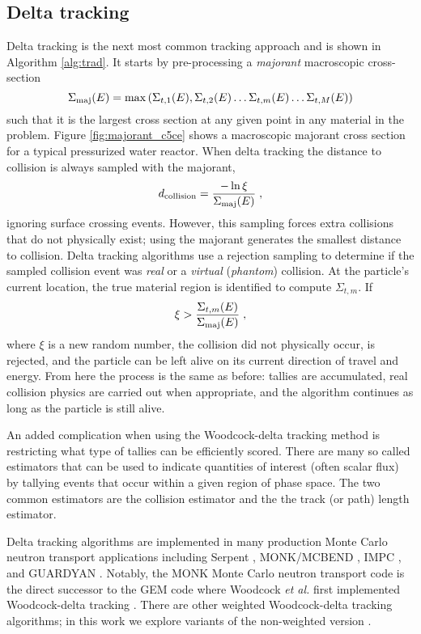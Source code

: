 \subsection{Delta tracking}
\label{c5:delta_tracking}

Delta tracking is the next most common tracking approach and is shown in Algorithm \ref{alg:trad}.
It starts by pre-processing a \textit{majorant} macroscopic cross-section
\begin{equation}
    \Sigma_{\text{maj}}(E) = \max\left({\Sigma_{t,1}(E), \Sigma_{t,2}(E) \dots \Sigma_{t,m}(E) \dots \Sigma_{t,M}(E)}\right)
\end{equation}
such that it is the largest cross section at any given point in any material in the problem.
Figure \ref{fig:majorant_c5ce} shows a macroscopic majorant cross section for a typical pressurized water reactor.
When delta tracking the distance to collision is always sampled with the majorant,
\begin{equation}
    d_{\text{collision}} = \frac{-\ln{\xi}}{\Sigma_{\text{maj}}(E)} \; ,
\end{equation}
ignoring surface crossing events.
However, this sampling forces extra collisions that do not physically exist; using the majorant generates the smallest distance to collision.
Delta tracking algorithms use a rejection sampling to determine if the sampled collision event was \textit{real} or a \textit{virtual} (\textit{phantom}) collision.
At the particle's current location, the true material region is identified to compute $\Sigma_{t,m}$.
If 
\begin{equation}
    \xi > \frac{\Sigma_{t,m}(E)}{\Sigma_{\text{maj}}(E)} \; ,
\end{equation}
where $\xi$ is a new random number, the collision did not physically occur, is rejected, and the particle can be left alive on its current direction of travel and energy.
From here the process is the same as before: tallies are accumulated, real collision physics are carried out when appropriate, and the algorithm continues as long as the particle is still alive.

An added complication when using the Woodcock-delta tracking method is restricting what type of tallies can be efficiently scored.
There are many so called estimators that can be used to indicate quantities of interest (often scalar flux) by tallying events that occur within a given region of phase space.
The two common estimators are the collision estimator and the the track (or path) length estimator.

Delta tracking algorithms are implemented in many production Monte Carlo neutron transport applications including Serpent \cite{leppanen_2010_burnup, leppanen_use_2017, leppanen_development_2013}, MONK/MCBEND \cite{richards_monk_2015}, IMPC \cite{fang_development_2022}, and GUARDYAN \cite{molnar_gpu_based_2019}.
Notably, the MONK Monte Carlo neutron transport code is the direct successor to the GEM code where Woodcock \textit{et al.} first implemented Woodcock-delta tracking \cite{woodcock_techniques_1965}.
There are other weighted Woodcock-delta tracking algorithms; in this work we explore variants of the non-weighted version \cite{molnar_variance_2018, morgan_weighted-delta-tracking_2015}.

